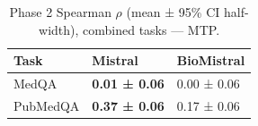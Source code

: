 \begin{table}
\caption{Phase 2 Spearman $\rho$ (mean ± 95\% CI half-width), combined tasks — MTP.}
\label{tab:phase2_spearman_all_mtp}
\begin{tabular}{lll}
\toprule
Task & Mistral & BioMistral \\
\midrule
MedQA & \textbf{0.01 ± 0.06} & 0.00 ± 0.06 \\
PubMedQA & \textbf{0.37 ± 0.06} & 0.17 ± 0.06 \\
\bottomrule
\end{tabular}
\end{table}
